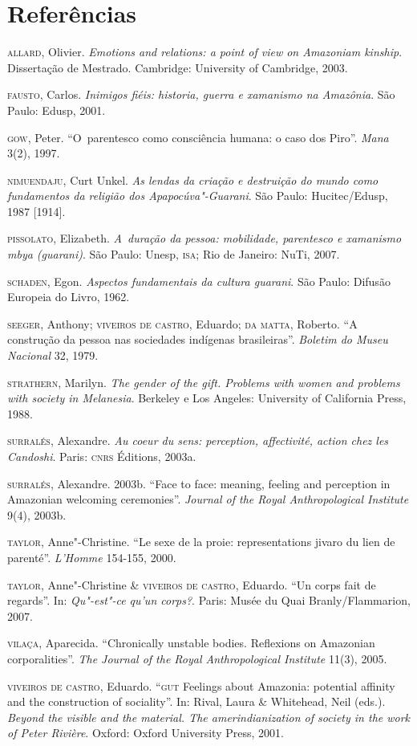 \section{Referências}

\begin{Parskip}
\textsc{allard}, Olivier. \emph{Emotions and relations: a point of view on
Amazoniam kinship}. Dissertação de Mestrado. Cambridge: University of
Cambridge, 2003.

\textsc{fausto}, Carlos. \emph{Inimigos fiéis: historia, guerra e xamanismo na
Amazônia}. São Paulo: Edusp, 2001.

\textsc{gow}, Peter. ``O~parentesco como consciência humana: o caso dos Piro''.
\emph{Mana} 3(2), 1997.

\textsc{nimuendaju}, Curt Unkel. \emph{As lendas da criação e destruição do mundo
como fundamentos da religião dos Apapocúva"-Guarani}. São Paulo:
Hucitec/Edusp, 1987 [1914].

\textsc{pissolato}, Elizabeth. \emph{A~duração da pessoa: mobilidade, parentesco
e xamanismo mbya (guarani)}. São Paulo: Unesp, \textsc{isa}; Rio de Janeiro:
NuTi, 2007.

\textsc{schaden}, Egon. \emph{Aspectos fundamentais da cultura guarani}. São
Paulo: Difusão Europeia do Livro, 1962.

\textsc{seeger}, Anthony; \textsc{viveiros de castro}, Eduardo; \textsc{da} \textsc{matta}, Roberto. ``A
construção da pessoa nas sociedades indígenas brasileiras''. \emph{Boletim do
Museu Nacional} 32, 1979.

\textsc{strathern}, Marilyn. \emph{The gender of the gift. Problems with women
and problems with society in Melanesia}. Berkeley e Los Angeles:
University of California Press, 1988.

\textsc{surralés}, Alexandre. \emph{Au coeur du sens: perception, affectivité,
action chez les Candoshi}. Paris: \textsc{cnrs} Éditions, 2003a.

\textsc{surralés}, Alexandre. 2003b. ``Face to face: meaning, feeling and
perception in Amazonian welcoming ceremonies''. \emph{Journal of the Royal
Anthropological Institute} 9(4), 2003b.

\textsc{taylor}, Anne"-Christine. ``Le sexe de la proie: representations
jivaro du lien de parenté''. \emph{L’Homme} 154-155, 2000.

\textsc{taylor}, Anne"-Christine \& \textsc{viveiros} \textsc{de} \textsc{castro}, Eduardo. ``Un corps
fait de regards''. In: \emph{Qu"-est"-ce qu’un corps?}. Paris: Musée du Quai
Branly/Flammarion, 2007.

\textsc{vilaça}, Aparecida. ``Chronically unstable bodies. Reflexions on
Amazonian corporalities''. \emph{The Journal of the Royal Anthropological
Institute} 11(3), 2005.

\textsc{viveiros} \textsc{de} \textsc{castro}, Eduardo. ``\textsc{gut} Feelings about Amazonia:
potential affinity and the construction of sociality''. In: Rival, Laura
\& Whitehead, Neil (eds.). \emph{Beyond the visible and the material. The
amerindianization of society in the work of Peter Rivière}. Oxford:
Oxford University Press, 2001.
\end{Parskip}


